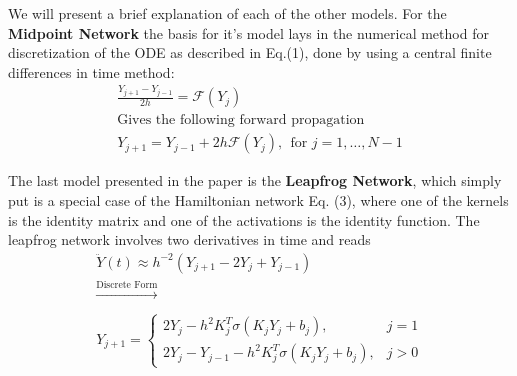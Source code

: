 \documentclass{article}
\theoremstyle{remark}
\begin{document}
\par 
    We will present a brief explanation of each of the other models. For the \textbf{Midpoint Network} the basis for it's model lays in the numerical 
method for discretization of the ODE as described in Eq.(1), done by using a central finite differences in time method: \\
\begin{gather*}
    \frac{Y_{j+1} - Y_{j-1}}{2h} = \mathcal{F}(Y_j) \\
    \text{Gives the following forward propagation } \\
    Y_{j+1} = Y_{j-1} + 2h \mathcal{F}(Y_j), \ \ \text{for } j = 1, \dots, N - 1
\end{gather*}
\par 
    The last model presented in the paper is the \textbf{Leapfrog Network}, which simply put is a special case of the Hamiltonian network Eq. (3), where one of the kernels is the identity 
matrix and one of the activations is the identity function. The leapfrog network involves two derivatives in time and reads 
\begin{gather*}
    \ddot{Y}(t) \approx h^{-2} (Y_{j+1} -2Y_j + Y_{j-1}) \\
    \xrightarrow[]{\text{Discrete Form}} \\
    Y_{j+1} = 
    \begin{cases}
        2Y_j - h^2 K^T_j \sigma (K_j Y_j + b_j),& j=1 \\
        2Y_j - Y_{j-1} - h^2 K^T_j \sigma (K_j Y_j + b_j),& j>0
    \end{cases}
\end{gather*}
\end{document}
